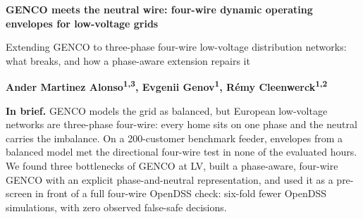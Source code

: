 \documentclass[9pt,a4paper]{extarticle}
\begin{document}
{\raggedright{}\color{navy}\fontsize{16}{18}\selectfont\bfseries GENCO meets the neutral wire: four-wire dynamic operating envelopes for low-voltage grids}\par
\vspace{2pt}
{\color{accent}\small Extending GENCO to three-phase four-wire low-voltage distribution networks: what breaks, and how a phase-aware extension repairs it}\par
\vspace{2pt}
{\small\textbf{Ander Martinez Alonso\textsuperscript{1,3}, Evgenii Genov\textsuperscript{1}, Rémy Cleenwerck\textsuperscript{1,2}}}\par
\vspace{3pt}

\colorbox{pale}{\parbox{\dimexpr\linewidth-2\fboxsep\relax}{
\textbf{In brief.} GENCO models the grid as balanced, but European low-voltage networks are three-phase four-wire: every home sits on one phase and the neutral carries the imbalance. On a 200-customer benchmark feeder, envelopes from a balanced model met the directional four-wire test in none of the evaluated hours. We found three bottlenecks of GENCO at LV, built a phase-aware, four-wire GENCO with an explicit phase-and-neutral representation, and used it as a pre-screen in front of a full four-wire OpenDSS check: six-fold fewer OpenDSS simulations, with zero observed false-safe decisions.
}}
\end{document}
